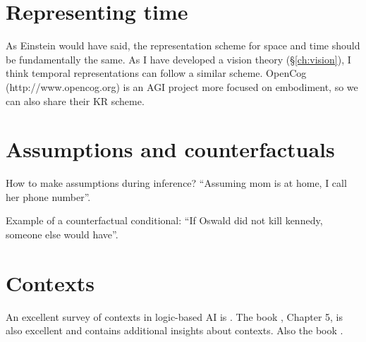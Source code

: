 \section{Representing time}

As Einstein would have said, the representation scheme for space and time should be fundamentally the same.  As I have developed a vision theory (\S\ref{ch:vision}), I think temporal representations can follow a similar scheme.  OpenCog (http://www.opencog.org) is an AGI project more focused on embodiment, so we can also share their KR scheme.

\section{Assumptions and counterfactuals}

How to make assumptions during inference?  ``Assuming mom is at home, I call her phone number''.

Example of a counterfactual conditional:  ``If Oswald did not kill kennedy, someone else would have''.

\section{Contexts}

An excellent survey of contexts in logic-based AI is \citep*{Akman1996}.  The book \citep*{Sowa2000}, Chapter 5, is also excellent and contains additional insights about contexts.  Also the book \citep*{Bonzon2000}.
